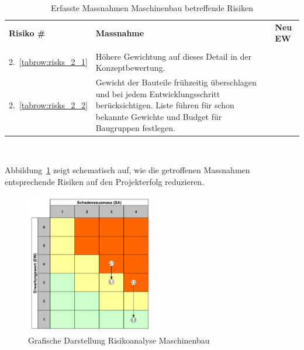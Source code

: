\documentclass[main.tex]{subfiles} %
\begin{document}
\begin{table}[H]
    \begin{tabularx}{\textwidth}{|>{\centering\arraybackslash}p{2cm}|>{\raggedright\arraybackslash}X|>{\centering\arraybackslash}p{0.75cm}|}
        \hline
        \textbf{Risiko \#}        & \textbf{Massnahme}
                                  & \textbf{Neu EW}                                                                                                                                                               \\                                                                                                                                                                                                 \\

        \hline
        \rowcolor{yellow!30}
        2.~\ref{tabrow:risks_2_1} & Höhere Gewichtung auf dieses Detail in der Konzeptbewertung.
                                  & 3                                                                                                                                                                             \\

        \hline
        \rowcolor{green!30}
        2.~\ref{tabrow:risks_2_2} & Gewicht der Bauteile frühzeitig überschlagen und bei jedem Entwicklungsschritt berücksichtigen. Liste führen für schon bekannte Gewichte und Budget für Baugruppen festlegen.
                                  & 1                                                                                                                                                                             \\

        \hline

    \end{tabularx}
    \caption{Erfasste Massnahmen Maschinenbau betreffende Risiken}~\label{tab:Erfasste_Massnahmen_mech}
\end{table}

Abbildung~\ref{fig:Diagramm_Risiko_mechanik} zeigt schematisch auf, wie die
getroffenen Massnahmen entsprechende Risiken auf den Projekterfolg reduzieren.

\begin{figure}[h]
    \centering
    \includegraphics[width=0.5\textwidth]{./Risks_Diagramm/Diagramm_Risiko_mechanik.pdf}
    \caption{Grafische Darstellung Risikoanalyse Maschinenbau}
    \label{fig:Diagramm_Risiko_mechanik}
\end{figure}
\end{document}
